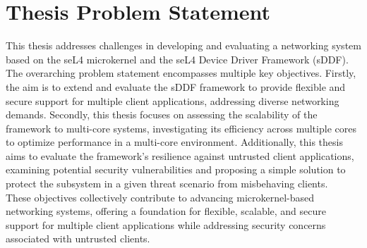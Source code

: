 \section{Thesis Problem Statement}
This thesis addresses challenges in developing and evaluating a networking system based on 
the seL4 microkernel and the seL4 Device Driver Framework (sDDF). The overarching 
problem statement encompasses multiple key objectives. Firstly, the aim is to extend and evaluate 
the sDDF framework to provide flexible and secure support for multiple client applications, 
addressing diverse networking demands. Secondly, this thesis focuses on assessing the scalability 
of the framework to multi-core systems, investigating its efficiency across multiple cores to 
optimize performance in a multi-core environment. Additionally, this thesis aims to evaluate the 
framework's resilience against untrusted client applications, examining potential security vulnerabilities 
and proposing a simple solution to protect the subsystem in a given threat scenario from misbehaving clients. \\

These objectives collectively contribute to advancing microkernel-based networking systems, offering
a foundation for flexible, scalable, and secure support for multiple client applications while addressing
security concerns associated with untrusted clients. 

